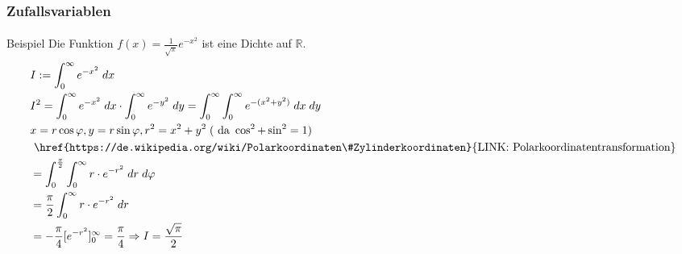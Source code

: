 \documentclass{beamer}
\begin{document}
\begin{frame}
    \frametitle{Zufallsvariablen}
\framesubtitle{}
\begin{block}{Beispiel}
Die Funktion $f(x) = \frac{1}{\sqrt{\pi}} e^{- x^2}$ ist eine Dichte auf $ \mathbb{R}$.
\begin{align*}
& I := \int_{0}^{\infty} e^{-x^2} \; dx\\
& I^2 =  \int_{0}^{\infty} e^{-x^2} \; dx \cdot    \int_{0}^{\infty} e^{-y^2} \; dy =    \int_{0}^{\infty} \int_{0}^{\infty} e^{-(x^2+y^2)} \; dx \;dy \\
&x=r \cos \varphi ,y=r\sin \varphi ,r^2 = x^2 + y^2  \; (\text{ da } \cos^2 + \sin^2 = 1)\\
 &\text{ \href{https://de.wikipedia.org/wiki/Polarkoordinaten\#Zylinderkoordinaten}{LINK: Polarkoordinatentransformation}} \\
& = \int_{0}^{\frac{\pi}{2}}  \int_{0}^{\infty}r \cdot e^{-r^2} \; dr \;d\varphi \\
&= \frac{\pi}{2} \int_{0}^{\infty}r \cdot e^{-r^2} \; dr \\
&= -\frac{\pi}{4} [e^{-r^2} ]_0^{\infty} = \frac{\pi}{4} \Rightarrow I = \frac{\sqrt{\pi}}{2}
\end{align*}
\end{block}
 \end{frame}
\end{document}
